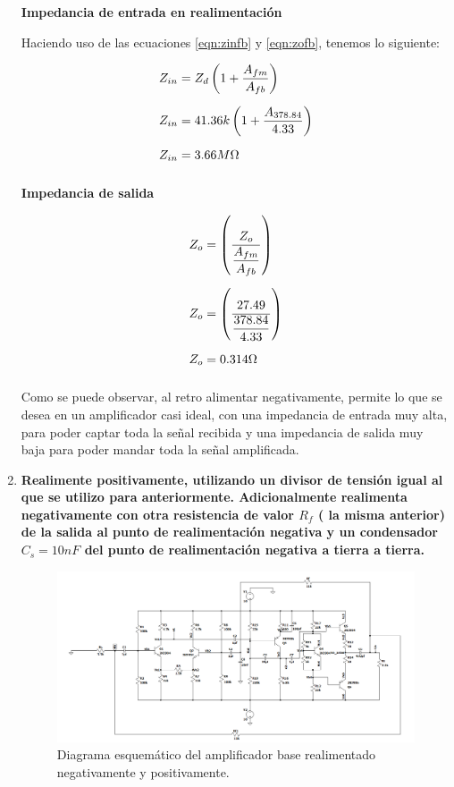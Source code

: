\begin{enumerate}
        \textbf{Impedancia de entrada en realimentación}

        Haciendo uso de las ecuaciones \ref{eqn:zinfb} y \ref{eqn:zofb}, tenemos lo siguiente:

        \begin{align*}
          Z_{in} & =Z_d\left(1 +\dfrac{A_{fm}}{A_{fb}}\right)      \\[0.2cm]
          Z_{in} & =41.36k\left(1 +\dfrac{A_{378.84}}{4.33}\right) \\[0.2cm]
          Z_{in} & =3.66 M\ohm                                     \\[0.2cm]
        \end{align*}

        \textbf{Impedancia de salida}

        \begin{align*}
          Z_{o} & =\left(\dfrac{Z_o}{\dfrac{A_{fm}}{A_{fb}}}\right) \\[0.2cm]
          Z_{o} & =\left(\dfrac{27.49}{\dfrac{378.84}{4.33}}\right) \\[0.2cm]
          Z_{o} & =0.314\ohm                                        \\[0.2cm]
        \end{align*}

        Como se puede observar, al retro alimentar negativamente, permite lo que se desea en un amplificador casi ideal, con una impedancia de entrada muy alta, para poder captar toda la señal recibida y una impedancia de salida muy baja para poder mandar toda la señal amplificada.

  \item \textbf{Realimente positivamente, utilizando un divisor de
          tensión igual al que se utilizo para anteriormente. Adicionalmente realimenta negativamente con otra resistencia de valor $R_f$ ( la misma anterior) de la salida al punto de realimentación negativa y un condensador $C_s = 10nF$ del punto de realimentación negativa a tierra a tierra.}

        \begin{figure}[H]
          \centering
          \includegraphics[width=\textwidth]{Imagenes/oscilador.png}
          \caption{Diagrama esquemático del amplificador base realimentado negativamente y positivamente.}
          \label{fig:oscilador}
        \end{figure}

\end{enumerate}
